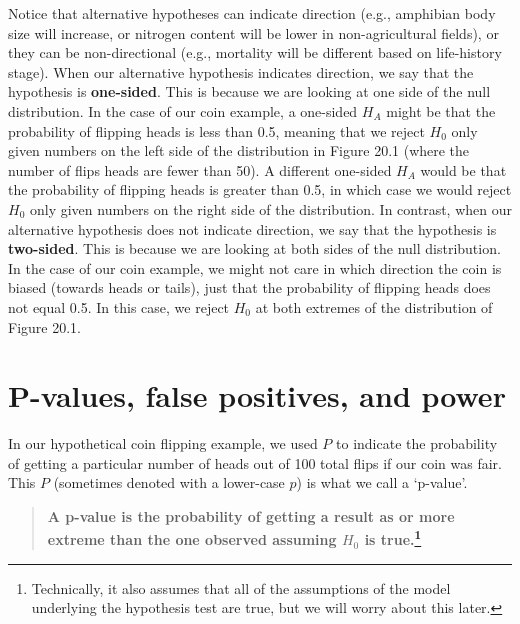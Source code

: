 \documentclass[
]{scrbook}
\begin{document}
Notice that alternative hypotheses can indicate direction (e.g., amphibian body size will increase, or nitrogen content will be lower in non-agricultural fields), or they can be non-directional (e.g., mortality will be different based on life-history stage).
When our alternative hypothesis indicates direction, we say that the hypothesis is \textbf{one-sided}.
This is because we are looking at one side of the null distribution.
In the case of our coin example, a one-sided \(H_{A}\) might be that the probability of flipping heads is less than 0.5, meaning that we reject \(H_{0}\) only given numbers on the left side of the distribution in Figure 20.1 (where the number of flips heads are fewer than 50).
A different one-sided \(H_{A}\) would be that the probability of flipping heads is greater than 0.5, in which case we would reject \(H_{0}\) only given numbers on the right side of the distribution.
In contrast, when our alternative hypothesis does not indicate direction, we say that the hypothesis is \textbf{two-sided}.
This is because we are looking at both sides of the null distribution.
In the case of our coin example, we might not care in which direction the coin is biased (towards heads or tails), just that the probability of flipping heads does not equal 0.5.
In this case, we reject \(H_{0}\) at both extremes of the distribution of Figure 20.1.

\hypertarget{p-values-false-positives-and-power}{%
\section{P-values, false positives, and power}\label{p-values-false-positives-and-power}}

In our hypothetical coin flipping example, we used \(P\) to indicate the probability of getting a particular number of heads out of 100 total flips if our coin was fair.
This \(P\) (sometimes denoted with a lower-case \(p\)) is what we call a `p-value'.

\begin{quote}
\textbf{A p-value is the probability of getting a result as or more extreme than the one observed assuming \(H_{0}\) is true.\footnote{Technically, it also assumes that all of the assumptions of the model underlying the hypothesis test are true, but we will worry about this later.}}
\end{quote}
\end{document}

